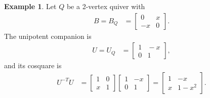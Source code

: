 \documentclass[11pt, letterpaper]{amsart}
\theoremstyle{definition}
\newtheorem{example}[theorem]{Example}
\numberwithin{equation}{section}
\begin{document}
\begin{example}
\label{eg:U-n=2}
Let $Q$ be a 2-vertex quiver with 
\begin{align*}
B=B_Q&=\begin{bmatrix} 
0 & x  \\
-x & 0 
\end{bmatrix}. 
\end{align*}
The unipotent companion is 
\begin{align*}
U=U_Q&=\begin{bmatrix} 
1 &  \! \!-x  \\
0 &  \! \!1 
\end{bmatrix}, 
\end{align*}
and its cosquare is 
\begin{align*}
U^{-T} U
&=
\begin{bmatrix} 
1 &  0  \\
x &  1 
\end{bmatrix}
\begin{bmatrix} 
1 &  -x  \\
0 &  1
\end{bmatrix}
=
\begin{bmatrix} 
1 &  -x  \\
x & 1-x^2 
\end{bmatrix}
\!\!.
\end{align*}
\end{example}
\end{document}
